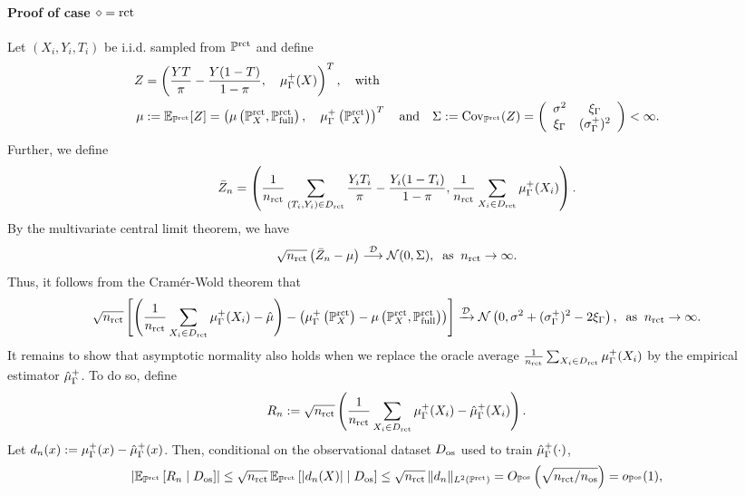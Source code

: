 \paragraph{Proof of case $\diamond=\mathrm{rct}$} 
 Let $(X_i,Y_i,T_i)$ be i.i.d. sampled from $\mathbb{P}^{\operatorname{rct}}$ and define \begin{align*}Z&=\left(\frac{YT}{\pi} - \frac{Y(1-T)}{1-\pi}, \quad\mu_\Gamma^+(X)\right)^T,\quad  \text{with} \\ \mu &:= \mathbb{E}_{\mathbb{P}^{\operatorname{rct}}}[Z] = \left(\mu\left(\mathbb{P}^{\operatorname{rct}}_X, \mathbb{P} ^{\operatorname{rct}}_{\operatorname{full}}\right), \quad \mu_\Gamma^+ \left(\mathbb{P}^{\operatorname{rct}}_X\right)\right)^T \quad \text{and} \quad \Sigma:=\operatorname{Cov}_{\mathbb{P}^{\operatorname{rct}}}(Z)= \left(\begin{array}{cc}\sigma^2 & \xi_\Gamma  \\ \xi_\Gamma & (\sigma^+_\Gamma)^2 \end{array} \right) < \infty.\end{align*}
Further, we define  
$$
\bar{Z}_n=\left( \frac{1}{n_{\operatorname{rct}}}  \sum_{(T_i,Y_i)  \in D_{\operatorname{rct}}}\frac{Y_iT_i}{\pi} - \frac{Y_i(1-T_i)}{1-\pi}   , \frac{1}{n_{\operatorname{rct}}}  \sum_{X_i  \in D_{\operatorname{rct}}} \mu_\Gamma^+(X_i) \right).
$$
By the multivariate central limit theorem, we have 
$$
\sqrt{n_{\operatorname{rct}}}\left(\bar{Z}_n-\mu\right) \stackrel{\mathcal{D}}{\longrightarrow} \mathcal{N}(0, \Sigma), \;\;\text{as}\;\;n_{\operatorname{rct}} \to \infty.
$$
Thus, it follows from the Cramér-Wold theorem that 
$$
\sqrt{n_{\operatorname{rct}}}\left[\left(\frac{1}{n_{\operatorname{rct}}}  \sum_{X_i  \in D_{\operatorname{rct}}} \mu_\Gamma^+(X_i)  - \hat{\mu}\right)-\left(\mu_\Gamma^+\left(\mathbb{P}^{\operatorname{rct}}_X\right) - \mu\left(\mathbb{P}^{\operatorname{rct}}_X, \mathbb{P} ^{\operatorname{rct}}_{\operatorname{full}} \right)\right)\right]\xrightarrow{\mathcal{D}} \mathcal{N} \left(0,  \sigma^2  +(\sigma^+_\Gamma)^2-2\xi_\Gamma\right),\;\;\text{as}\;\;n_{\operatorname{rct}} \to \infty.$$
It remains to show that asymptotic normality also holds when we replace the oracle average $\frac{1}{n_{\operatorname{rct}}}\sum_{X_i \in D_{\operatorname{rct}}} \mu_\Gamma^+(X_i)$ by the empirical estimator $\hat{\mu}_\Gamma^+$. To do so, define
\begin{equation}
\label{eq:convg}
R_n := \sqrt{n_{\operatorname{rct}}}\left(\frac{1}{n_{\operatorname{rct}}}\sum_{X_i \in D_{\operatorname{rct}}} \mu_\Gamma^+(X_i) - \hat{\mu}_\Gamma^+(X_i)\right).
\end{equation}
Let $d_n(x) := \mu_\Gamma^+(x) - \hat{\mu}_\Gamma^+(x)$. Then, conditional on the observational dataset $D_{\mathrm{os}}$ used to train $\hat{\mu}^+_\Gamma(\cdot)$, 
\begin{align*}
\left|\mathbb{E}_{\mathbb{P}^{\operatorname{rct}}}\left[R_n \mid D_{\mathrm{os}}\right]\right|
\leq \sqrt{n_{\operatorname{rct}}}\,\mathbb{E}_{\mathbb{P}^{\operatorname{rct}}}\left[|d_n(X)| \mid D_{\mathrm{os}}\right]
\leq \sqrt{n_{\operatorname{rct}}}\,\|d_n\|_{L^2(\mathbb{P}^{\operatorname{rct}})}
= O_{\mathbb{P}^{\operatorname{os}}}\left(\sqrt{n_{\operatorname{rct}}/n_{\operatorname{os}}}\right)
= o_{\mathbb{P}^{\operatorname{os}}}(1),
\end{align*}
